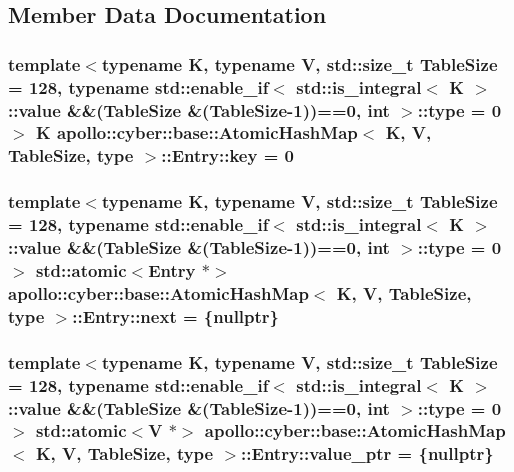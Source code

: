 \subsection{Member Data Documentation}
\hypertarget{structapollo_1_1cyber_1_1base_1_1AtomicHashMap_1_1Entry_a92d89dfd94973438aa8db43a8bbebee6}{
\subsubsection[{key}]{\setlength{\rightskip}{0pt plus 5cm}template$<$typename K, typename V, std\-::size\-\_\-t Table\-Size = 128, typename std\-::enable\-\_\-if$<$ std\-::is\-\_\-integral$<$ K $>$\-::value \&\&(\-Table\-Size \&(\-Table\-Size-\/1))==0, int $>$\-::type = 0$>$ K {\bf apollo\-::cyber\-::base\-::\-Atomic\-Hash\-Map}$<$ K, V, Table\-Size, type $>$\-::Entry\-::key = 0}}\label{structapollo_1_1cyber_1_1base_1_1AtomicHashMap_1_1Entry_a92d89dfd94973438aa8db43a8bbebee6}
\hypertarget{structapollo_1_1cyber_1_1base_1_1AtomicHashMap_1_1Entry_af0f925e9c620cb000999d0dafd872e0f}{
\subsubsection[{next}]{\setlength{\rightskip}{0pt plus 5cm}template$<$typename K, typename V, std\-::size\-\_\-t Table\-Size = 128, typename std\-::enable\-\_\-if$<$ std\-::is\-\_\-integral$<$ K $>$\-::value \&\&(\-Table\-Size \&(\-Table\-Size-\/1))==0, int $>$\-::type = 0$>$ std\-::atomic$<${\bf Entry} $\ast$$>$ {\bf apollo\-::cyber\-::base\-::\-Atomic\-Hash\-Map}$<$ K, V, Table\-Size, type $>$\-::Entry\-::next = \{nullptr\}}}\label{structapollo_1_1cyber_1_1base_1_1AtomicHashMap_1_1Entry_af0f925e9c620cb000999d0dafd872e0f}
\hypertarget{structapollo_1_1cyber_1_1base_1_1AtomicHashMap_1_1Entry_ac717cbc0d8b0e10085e6458790f2a30f}{
\subsubsection[{value\-\_\-ptr}]{\setlength{\rightskip}{0pt plus 5cm}template$<$typename K, typename V, std\-::size\-\_\-t Table\-Size = 128, typename std\-::enable\-\_\-if$<$ std\-::is\-\_\-integral$<$ K $>$\-::value \&\&(\-Table\-Size \&(\-Table\-Size-\/1))==0, int $>$\-::type = 0$>$ std\-::atomic$<$V $\ast$$>$ {\bf apollo\-::cyber\-::base\-::\-Atomic\-Hash\-Map}$<$ K, V, Table\-Size, type $>$\-::Entry\-::value\-\_\-ptr = \{nullptr\}}}\label{structapollo_1_1cyber_1_1base_1_1AtomicHashMap_1_1Entry_ac717cbc0d8b0e10085e6458790f2a30f}


